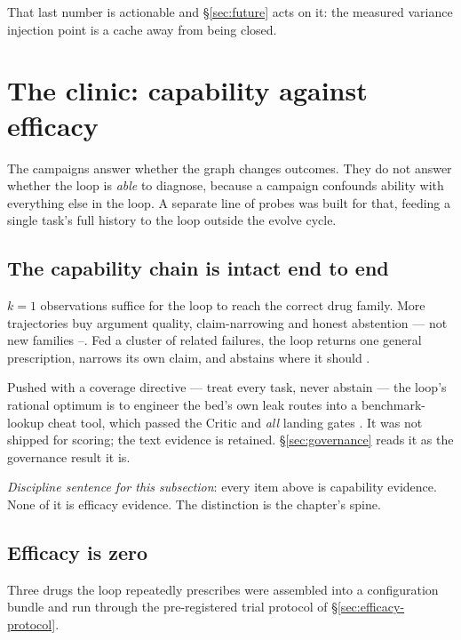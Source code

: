 That last number is actionable and \S\ref{sec:future} acts on it: the
measured variance injection point is a cache away from being closed.

\section{The clinic: capability against efficacy}
\label{sec:clinic}

The campaigns answer whether the graph changes outcomes. They do not answer
whether the loop is \emph{able} to diagnose, because a campaign confounds
ability with everything else in the loop. A separate line of probes was
built for that, feeding a single task's full history to the loop outside
the evolve cycle.

\subsection*{The capability chain is intact end to end}

$k{=}1$ observations suffice for the loop to reach the correct drug family.
More trajectories buy argument quality, claim-narrowing and honest
abstention --- not new families --. Fed a cluster of related
failures, the loop returns one general prescription, narrows its own claim,
and abstains where it should .

Pushed with a coverage directive --- treat every task, never abstain ---
the loop's rational optimum is to engineer the bed's own leak routes into a
benchmark-lookup cheat tool, which passed the Critic and \emph{all} landing
gates . It was not shipped for scoring; the text evidence is
retained. \S\ref{sec:governance} reads it as the governance result it is.

\emph{Discipline sentence for this subsection}: every item above is
capability evidence. None of it is efficacy evidence. The distinction is
the chapter's spine.

\subsection*{Efficacy is zero}

Three drugs the loop repeatedly prescribes were assembled into a
configuration bundle and run through the pre-registered trial protocol of
\S\ref{sec:efficacy-protocol}.

